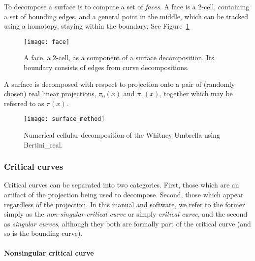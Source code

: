To decompose a surface is to compute a set of {\em faces}.  A face is a 2-cell, containing a set of bounding edges, and a general point in the middle, which can be tracked using a homotopy, staying within the boundary.  See Figure~\ref{fig:face}

\begin{figure}[H]
\begin{center}
\texttt{[image: face]}
\caption{A face, a 2-cell, as a component of a surface decomposition.  Its boundary consists of edges from curve decompositions.}
\label{fig:face}
\end{center}
\end{figure}

A surface is decomposed with respect to projection onto a pair of (randomly chosen) real linear projections, $\pi_0(x)$ and $\pi_1(x)$, together which may be referred to as $\pi(x)$.

\begin{figure}[H]
\begin{center}
\texttt{[image: surface\_method]}
\caption{Numerical cellular decomposition of the Whitney Umbrella using Bertini\_real.}
\label{fig:decomposing_surface}
\end{center}
\end{figure}






\subsubsection{Critical curves}

Critical curves can be separated into two categories.  First, those which are an artifact of the projection being used to decompose.  Second, those which appear regardless of the projection.  In this manual and software, we refer to the former simply as the {\em non-singular critical curve} or simply {\em critical curve}, and the second as {\em singular curves}, although they both are formally part of the critical curve (and so is the bounding curve).


\paragraph{Nonsingular critical curve}

